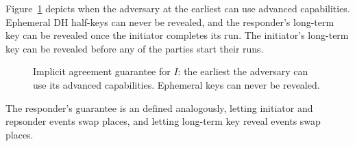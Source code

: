 %
Figure~\ref{fig:impAgreeI} depicts when the adversary at the earliest can use
advanced capabilities.
%
Ephemeral DH half-keys can never be revealed, and the responder's long-term key
can be revealed once the initiator completes its run.
%
The initiator's long-term key can be revealed before any of the parties start
their runs.
%
\begin{figure}[h!]
    \begin{center}
        \tikzset{>=latex}
        \caption{Implicit agreement guarantee for $I$: the earliest the
        adversary can use its advanced capabilities. Ephemeral keys can never be
        revealed.}
        \label{fig:impAgreeI}
    \end{center}
\end{figure}
%
The responder's guarantee is an defined analogously, letting initiator and
repsonder events swap places, and letting long-term key reveal events swap
places.\\
%

